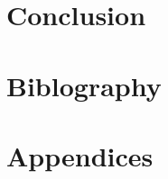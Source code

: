 \documentclass[a4paper]{article}
\begin{document}
    \section{Conclusion}
    \section{Biblography}
    
    

    \section{Appendices}
\end{document}
